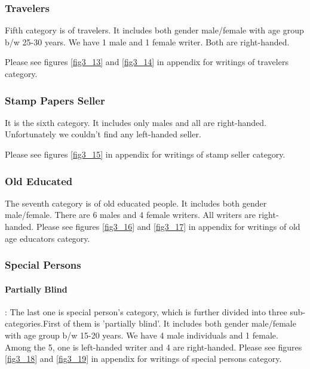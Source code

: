 \subsubsection{Travelers}
Fifth category is of travelers. It includes both gender male/female with age group b/w 25-30 years. We have 1 male and 1 female writer. Both are right-handed.

Please see figures \ref{fig3_13} and \ref{fig3_14} in appendix for writings of travelers category.


\subsubsection{Stamp Papers Seller}
It is the sixth category. It includes only males and all are right-handed. Unfortunately we couldn’t find any left-handed seller.

 Please see figures \ref{fig3_15} in appendix for writings of stamp seller category.
\subsubsection{Old Educated}
The seventh category is of old educated people. It includes both gender male/female. There are 6 males and 4 female writers. All writers are right-handed.
Please see figures \ref{fig3_16} and \ref{fig3_17} in appendix for writings of old age educators category.

\subsubsection{Special Persons}

\paragraph{Partially Blind}: The last one is special person’s category, which is further divided into three sub-categories.First of them is 'partially blind’. It includes both gender male/female with age group b/w 15-20 years. We have 4 male individuals and 1 female.  Among the 5, one is left-handed writer and 4 are right-handed. Please see figures \ref{fig3_18} and \ref{fig3_19} in appendix for writings of special persons category.

